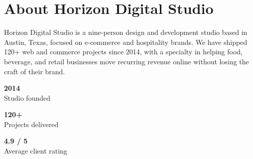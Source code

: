 \section{About Horizon Digital Studio}

Horizon Digital Studio is a nine-person design and development studio based in Austin, Texas,
focused on e-commerce and hospitality brands. We have shipped 120+ web and commerce projects
since 2014, with a specialty in helping food, beverage, and retail businesses move recurring
revenue online without losing the craft of their brand.

\vspace{0.4em}
\noindent
\begin{minipage}[t]{0.315\linewidth}
  \begin{tcolorbox}[statbox]
    \centering
    {\Large\bfseries\color{accent2}2014}\\
    {\small\color{softgray}Studio founded}
  \end{tcolorbox}
\end{minipage}\hfill
\begin{minipage}[t]{0.315\linewidth}
  \begin{tcolorbox}[statbox]
    \centering
    {\Large\bfseries\color{accent2}120+}\\
    {\small\color{softgray}Projects delivered}
  \end{tcolorbox}
\end{minipage}\hfill
\begin{minipage}[t]{0.315\linewidth}
  \begin{tcolorbox}[statbox]
    \centering
    {\Large\bfseries\color{accent2}4.9 / 5}\\
    {\small\color{softgray}Average client rating}
  \end{tcolorbox}
\end{minipage}

\clearpage

